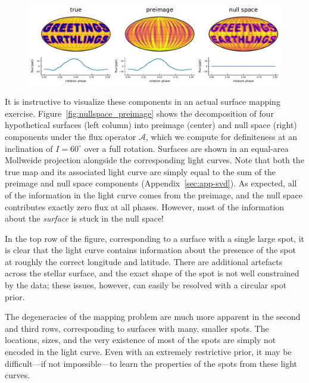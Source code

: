 \documentclass[modern]{aastex62}
\begin{document}
\begin{figure}[p!]
\begin{centering}
        \\[1em]
        \includegraphics[width=\linewidth]{figures/nullspace_preimage_85d.pdf}
    \end{centering}
\end{figure}

It is instructive to visualize these components in
an actual surface mapping exercise. Figure~\ref{fig:nullspace_preimage}
shows the decomposition of four hypothetical surfaces (left
column) into preimage (center) and null space (right)
components under the flux operator $\pmb{\mathcal{A}}$, which we compute for
definiteness at an inclination of $I = 60^\circ$ over a full rotation.
Surfaces are shown in an equal-area Mollweide projection alongside
the corresponding light curves.
Note that both the true map and its associated light curve are simply equal to
the sum of the preimage and null space components (Appendix~\ref{sec:app-svd}).
%
As expected, all of the information in the light curve comes
from the preimage, and the null space contributes exactly zero
flux at all phases. However, most of the information about the
\emph{surface} is stuck in the null space!

In the top row of the figure, corresponding to a surface with
a single large spot, it is clear that the light curve
contains information about the presence of the spot at roughly the
correct longitude and latitude. There are additional artefacts
across the stellar surface, and the exact shape of the spot is
not well constrained by the data; these issues, however, can
easily be resolved with a circular spot prior.

The degeneracies of the mapping problem are much more apparent
in the second and third rows, corresponding to surfaces with
many, smaller spots. The locations, sizes, and the very existence
of most of the spots are simply not encoded in the light curve.
Even with an extremely restrictive prior, it may be difficult---if
not impossible---to learn the properties of the spots
from these light curves.
\end{document}
